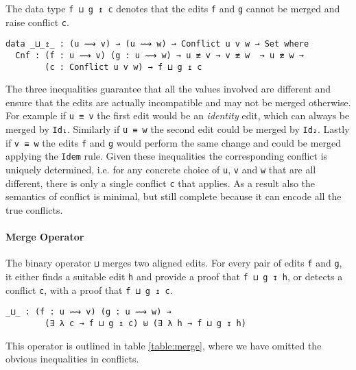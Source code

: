\documentclass[preprint]{sigplanconf}
\begin{document}
	The data type \texttt{f ⊔ g ↥ c} denotes that the edits
        \texttt{f} and \texttt{g} cannot be merged and raise conflict
        \texttt{c}.

\begin{verbatim}
data _⊔_↥_ : (u ⟿ v) → (u ⟿ w) → Conflict u v w → Set where
  Cnf : (f : u ⟿ v) (g : u ⟿ w) → u ≢ v → v ≢ w  → u ≢ w → 
        (c : Conflict u v w) → f ⊔ g ↥ c
\end{verbatim}

	The three inequalities guarantee that all the values involved are different
        and ensure that the edits are actually incompatible and may not be merged 
        otherwise. For example if \texttt{u ≡ v} the first edit would be an
        \emph{identity} edit, which can always be merged by
        \texttt{Id₁}. Similarly if \texttt{u ≡ w} the second edit could be merged
        by \texttt{Id₂}. Lastly if \texttt{v ≡ w} the edits \texttt{f} and \texttt{g}
        would perform the same change and could be merged applying the \texttt{Idem}
        rule.
        Given these inequalities the corresponding conflict is uniquely determined,
        i.e. for any concrete choice of \texttt{u}, \texttt{v} and \texttt{w} that
        are all different, there is only a single conflict \texttt{c} that applies.
	As a result also the semantics of conflict is minimal, but still complete
        because it can encode all the true conflicts.

	\paragraph{Merge Operator}
	The binary operator \texttt{⊔} merges 
	two aligned edits. For every pair of edits \texttt{f} and \texttt{g}, 
	it either finds a suitable edit \texttt{h} and provide
	a proof that \texttt{f ⊔ g ↧ h}, or detects a conflict \texttt{c}, 
	with a proof that \texttt{f ⊔ g ↥ c}.

\begin{verbatim}
_⊔_ : (f : u ⟿ v) (g : u ⟿ w) →
        (∃ λ c → f ⊔ g ↥ c) ⊎ (∃ λ h → f ⊔ g ↧ h)
\end{verbatim}
	This operator is outlined in table \ref{table:merge}, where we have
        omitted the obvious inequalities in conflicts.
\end{document}
